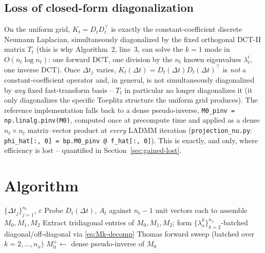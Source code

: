 \documentclass[11pt]{article}
\newcommand{\eps}{\varepsilon}
\newcommand{\dt}{\Delta t}
\newcommand{\Ch}{\mathcal{C}^\eps_h}
\newcommand{\code}[1]{\texttt{#1}}
\newcommand{\lx}{\lambda_x^k}
\begin{document}
\subsection{Loss of closed-form diagonalization}

On the uniform grid, $K_t=D_tD_t^\top$ is exactly the constant-coefficient discrete Neumann
Laplacian, simultaneously diagonalized by the fixed orthogonal DCT-II matrix $T_t$ (this is why
Algorithm~2, line~3, can solve the $k{=}1$ mode in $O(n_t\log n_t)$: one forward DCT, one
division by the $n_t$ known eigenvalues $\lambda_t^i$, one inverse DCT). Once $\dt_j$ varies,
$K_t(\dt)=D_t(\dt)D_t(\dt)^\top$ is \emph{not} a constant-coefficient operator and, in general,
is not simultaneously diagonalized by \emph{any} fixed fast-transform basis -- $T_t$ in
particular no longer diagonalizes it (it only diagonalizes the specific Toeplitz structure the
uniform grid produces). The reference implementation falls back to a dense pseudo-inverse,
\code{M0\_pinv = np.linalg.pinv(M0)}, computed once at precompute time and applied as a dense
$n_t\times n_t$ matrix--vector product at \emph{every} LADMM iteration
(\code{projection\_nu.py}: \code{phi\_hat[:, 0] = bp.M0\_pinv @ f\_hat[:, 0]}). This is exactly,
and only, where efficiency is lost -- quantified in Section~\ref{sec:gained-lost}.

\section{Algorithm}

\begin{algorithm}[h]
\caption{Precompute for $\mathrm{Proj}_{\Ch(\dt)}$, graded grid}
\begin{algorithmic}[1]
\Require $\{\dt_j\}_{j=1}^{n_t}$, $\eps$
\State Probe $D_t(\dt)$, $A_t$ against $n_t{-}1$ unit vectors each to assemble $M_0,M_1,M_2$
\State Extract tridiagonal entries of $M_0,M_1,M_2$; form $\{\lx\}_{k=2}^{n_x}$-batched
  diagonal/off-diagonal via \eqref{eq:Mk-decomp}
\State Thomas forward sweep (batched over $k=2,\dots,n_x$)
\State $M_0^+ \leftarrow$ dense pseudo-inverse of $M_0$
\end{algorithmic}
\end{algorithm}
\end{document}
